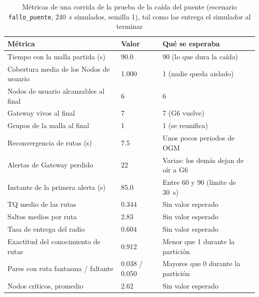 \begin{table}[htbp!]
    \centering
    \caption{Métricas de una corrida de la prueba de la caída del puente (escenario \texttt{fallo\_puente}, 240~s simulados, semilla 1), tal como las entrega el simulador al terminar}
    \label{tab:corrida-puente}
    \footnotesize
    \begin{tabular}{|p{7.4cm}|p{2.0cm}|p{4.2cm}|}
        \hline
        \textbf{Métrica} & \textbf{Valor} & \textbf{Qué se esperaba} \\
        \hline
        Tiempo con la malla partida (s) & 90.0 & 90 (lo que dura la caída) \\
        \hline
        Cobertura media de los Nodos de usuario & 1.000 & 1 (nadie queda aislado) \\
        \hline
        Nodos de usuario alcanzables al final & 6 & 6 \\
        \hline
        Gateway vivos al final & 7 & 7 (G6 vuelve) \\
        \hline
        Grupos de la malla al final & 1 & 1 (se reunifica) \\
        \hline
        Reconvergencia de rutas (s) & 7.5 & Unos pocos periodos de OGM \\
        \hline
        Alertas de Gateway perdido & 22 & Varias: los demás dejan de oír a G6 \\
        \hline
        Instante de la primera alerta (s) & 85.0 & Entre 60 y 90 (límite de 30~s) \\
        \hline
        TQ medio de las rutas & 0.344 & Sin valor esperado \\
        \hline
        Saltos medios por ruta & 2.83 & Sin valor esperado \\
        \hline
        Tasa de entrega del radio & 0.604 & Sin valor esperado \\
        \hline
        Exactitud del conocimiento de rutas & 0.912 & Menor que 1 durante la partición \\
        \hline
        Pares con ruta fantasma / faltante & 0.038 / 0.050 & Mayores que 0 durante la partición \\
        \hline
        Nodos críticos, promedio & 2.62 & Sin valor esperado \\
        \hline
    \end{tabular}
\end{table}

